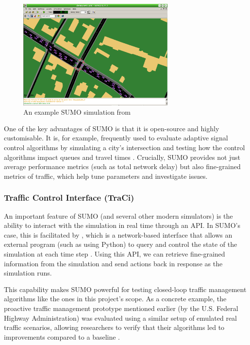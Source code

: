 \begin{figure}[!ht]
  \centering
  \includegraphics[width=0.7\textwidth]{images/background/sumo_example.png}
  \caption[An example SUMO simulation]{An example SUMO simulation from~\cite{noauthor_getting_nodate}}
  \label{fig:SUMO_example}
\end{figure} 

One of the key advantages of SUMO is that it is open-source and highly customisable. It is, for example, frequently used to evaluate adaptive signal control algorithms by simulating a city’s intersection and testing how the control algorithms impact queues and travel times \cite{krajzewicz_traffic_2010}. Crucially, SUMO provides not just average performance metrics (such as total network delay) but also fine-grained metrics of traffic, which help tune parameters and investigate issues.

\subsubsection{Traffic Control Interface (TraCi)}
An important feature of SUMO (and several other modern simulators) is the ability to interact with the simulation in real time through an API. In SUMO’s case, this is facilitated by , which is a network-based interface that allows an external program (such as using Python) to query and control the state of the simulation at each time step \cite{krajzewicz_traffic_2010}. Using this API, we can retrieve fine-grained information from the simulation and send actions back in response as the simulation runs.

This capability makes SUMO powerful for testing closed-loop traffic management algorithms like the ones in this project’s scope. As a concrete example, the proactive traffic management prototype mentioned earlier (by the U.S. Federal Highway Administration) was evaluated using a similar setup of emulated real traffic scenarios, allowing researchers to verify that their algorithms led to improvements compared to a baseline \cite{us_department_of_transportation_federal_highway_administration_predictive_nodate}.

